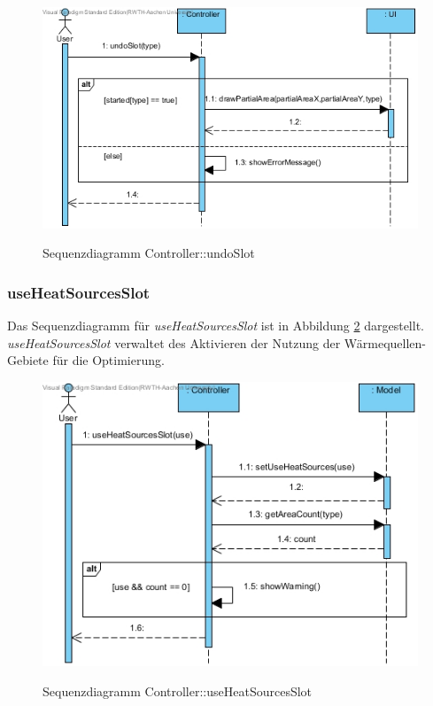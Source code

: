 \begin{figure}[H]
	\centering
	\includegraphics[scale=.75]{Bilder/Controller__undoSlot().jpg}\\
	\caption{Sequenzdiagramm Controller::undoSlot}
	\label{Sequenzdiagramm Controller::undoSlot}
\end{figure}

\subsubsection*{useHeatSourcesSlot}

Das Sequenzdiagramm für \emph{useHeatSourcesSlot} ist in Abbildung \ref{Sequenzdiagramm Controller::useHeatSourcesSlot} dargestellt. \emph{useHeatSourcesSlot} verwaltet des Aktivieren der Nutzung der Wärmequellen-Gebiete für die Optimierung.

\begin{figure}[H]
	\centering
	\includegraphics[scale=.75]{Bilder/Controller__useHeatSourcesSlot().jpg}\\
	\caption{Sequenzdiagramm Controller::useHeatSourcesSlot}
	\label{Sequenzdiagramm Controller::useHeatSourcesSlot}
\end{figure}

